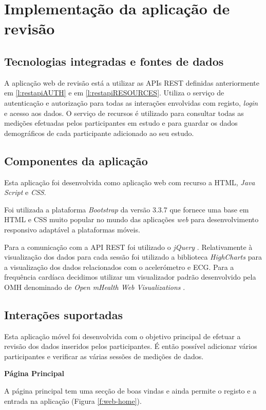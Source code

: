 \section{Implementação da aplicação de revisão}
\subsection{Tecnologias integradas e fontes de dados}

A aplicação web de revisão está a utilizar as \gls{API}s \gls{REST} definidas anteriormente em \ref{l:restapiAUTH} e em \ref{l:restapiRESOURCES}. Utiliza o serviço de autenticação e autorização para todas as interações envolvidas com registo, \textit{login} e acesso aos dados. O serviço de recursos é utilizado para consultar todas as medições efetuadas pelos participantes em estudo e para guardar os dados demográficos de cada participante adicionado ao seu estudo.\par

\subsection{Componentes da aplicação}
Esta aplicação foi desenvolvida como aplicação web com recurso a \gls{HTML}, \textit{Java Script} e \textit{\gls{CSS}}. \par 
Foi utilizada a plataforma \textit{Bootstrap} \cite{bootstrap} da versão 3.3.7 que fornece uma base em \gls{HTML} e \gls{CSS} muito popular no mundo das aplicações \textit{web} para desenvolvimento responsivo adaptável a plataformas móveis. \par
Para a comunicação com a \gls{API} \gls{REST} foi utilizado o \textit{jQuery} \cite{jquery}.
Relativamente à visualização dos dados para cada sessão foi utilizado a biblioteca \textit{HighCharts} \cite{highcharts} para a visualização dos dados relacionados com o acelerómetro e \gls{ECG}. Para a frequência cardíaca decidimos utilizar um visualizador padrão desenvolvido pela \gls{OMH} denominado de \textit{Open mHealth Web Visualizations} \cite{omhwebvisualizations}.

\subsection{Interações suportadas }


Esta aplicação móvel foi desenvolvida com o objetivo principal de efetuar a revisão dos dados inseridos pelos participantes. É então possível adicionar vários participantes e verificar as várias sessões de medições de dados.
\par
\textbf{Página Principal}
\par
A página principal tem uma secção de boas vindas e ainda permite o registo e a entrada na aplicação (Figura \ref{f:web-home}).

